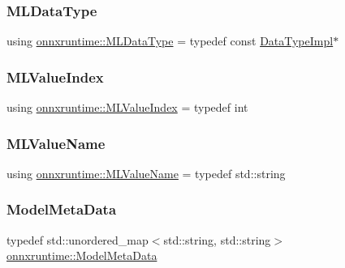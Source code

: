 \mbox{\label{namespaceonnxruntime_ad77d0a6e838ec7da5dc35fed5ee66b49}} 
\subsubsection{\texorpdfstring{M\+L\+Data\+Type}{MLDataType}}
{\footnotesize\ttfamily using \mbox{\hyperlink{namespaceonnxruntime_ad77d0a6e838ec7da5dc35fed5ee66b49}{onnxruntime\+::\+M\+L\+Data\+Type}} = typedef const \mbox{\hyperlink{classonnxruntime_1_1DataTypeImpl}{Data\+Type\+Impl}}$\ast$}

\mbox{\label{namespaceonnxruntime_ab37a9454e2bb44bd7f75a95158097c8a}} 
\subsubsection{\texorpdfstring{M\+L\+Value\+Index}{MLValueIndex}}
{\footnotesize\ttfamily using \mbox{\hyperlink{namespaceonnxruntime_ab37a9454e2bb44bd7f75a95158097c8a}{onnxruntime\+::\+M\+L\+Value\+Index}} = typedef int}

\mbox{\label{namespaceonnxruntime_a27bd8348d5fcc1966f784f29ff7a5581}} 
\subsubsection{\texorpdfstring{M\+L\+Value\+Name}{MLValueName}}
{\footnotesize\ttfamily using \mbox{\hyperlink{namespaceonnxruntime_a27bd8348d5fcc1966f784f29ff7a5581}{onnxruntime\+::\+M\+L\+Value\+Name}} = typedef std\+::string}

\mbox{\label{namespaceonnxruntime_a13519c21da77ccc594726b670276a266}} 
\subsubsection{\texorpdfstring{Model\+Meta\+Data}{ModelMetaData}}
{\footnotesize\ttfamily typedef std\+::unordered\+\_\+map$<$std\+::string, std\+::string$>$ \mbox{\hyperlink{namespaceonnxruntime_a13519c21da77ccc594726b670276a266}{onnxruntime\+::\+Model\+Meta\+Data}}}

